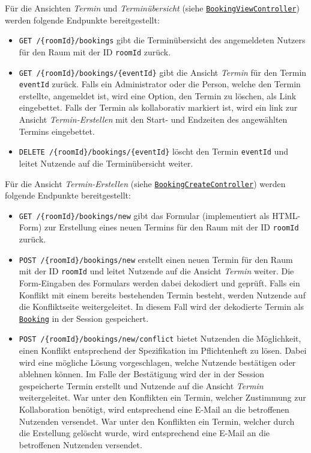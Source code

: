 Für die Ansichten \textit{Termin} und \textit{Terminübersicht} (siehe \hyperref[edu.kit.hci.soli.controller.BookingViewController]{\texttt{BookingViewController}}) werden folgende Endpunkte bereitgestellt:
\begin{itemize}
    \item \texttt{GET /\{roomId\}/bookings} gibt die Terminübersicht des angemeldeten Nutzers für den Raum mit der ID \texttt{roomId} zurück.
    \item \texttt{GET /\{roomId\}/bookings/\{eventId\}} gibt die Ansicht \textit{Termin} für den Termin \texttt{eventId} zurück.
          Falls ein Administrator oder die Person, welche den Termin erstellte, angemeldet ist, wird eine Option, den Termin zu löschen, als Link eingebettet.
          Falls der Termin als kollaborativ markiert ist, wird ein link zur Ansicht \textit{Termin-Erstellen} mit den Start- und Endzeiten des angewählten Termins eingebettet.
    \item \texttt{DELETE /\{roomId\}/bookings/\{eventId\}} löscht den Termin \texttt{eventId} und leitet Nutzende auf die Terminübersicht weiter.
\end{itemize}

Für die Ansicht \textit{Termin-Erstellen} (siehe \hyperref[edu.kit.hci.soli.controller.BookingCreateController]{\texttt{BookingCreateController}}) werden folgende Endpunkte bereitgestellt:
\begin{itemize}
    \item \texttt{GET /\{roomId\}/bookings/new} gibt das Formular (implementiert als \gls{HTML-Form}) zur Erstellung eines neuen Termins für den Raum mit der ID \texttt{roomId} zurück.
    \item \texttt{POST /\{roomId\}/bookings/new} erstellt einen neuen Termin für den Raum mit der ID \texttt{roomId} und leitet Nutzende auf die Ansicht \textit{Termin} weiter.
          Die Form-Eingaben des Formulars werden dabei dekodiert und geprüft.
          Falls ein Konflikt mit einem bereits bestehenden Termin besteht, werden Nutzende auf die Konfliktseite weitergeleitet.
          In diesem Fall wird der dekodierte Termin als \hyperref[edu.kit.hci.soli.domain.Booking]{\texttt{Booking}} in der Session gespeichert.
    \item \texttt{POST /\{roomId\}/bookings/new/conflict} bietet Nutzenden die Möglichkeit, einen Konflikt entsprechend der Spezifikation im Pflichtenheft zu lösen.
          Dabei wird eine mögliche Lösung vorgeschlagen, welche Nutzende bestätigen oder ablehnen können.
          Im Falle der Bestätigung wird der in der Session gespeicherte Termin erstellt und Nutzende auf die Ansicht \textit{Termin} weitergeleitet.
          War unter den Konflikten ein Termin, welcher Zustimmung zur Kollaboration benötigt, wird entsprechend eine E-Mail an die betroffenen Nutzenden versendet.
          War unter den Konflikten ein Termin, welcher durch die Erstellung gelöscht wurde, wird entsprechend eine E-Mail an die betroffenen Nutzenden versendet.
\end{itemize}

